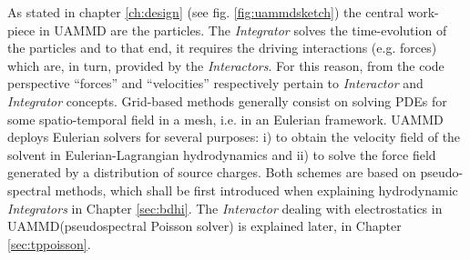 \documentclass[ twoside,openright,titlepage,numbers=noenddot,%
headinclude,footinclude,cleardoublepage=empty,abstract=on,
BCOR=5mm,paper=a4,fontsize=11pt, dvipsnames
]{scrreprt}
\newcommand{\uammd}{\gls{UAMMD}\xspace}
\begin{document}
As stated in chapter \ref{ch:design} (see fig. \ref{fig:uammdsketch}) the central work-piece in \uammd are the particles. The \emph{Integrator} solves the time-evolution of the particles and to that end, it requires the driving interactions (e.g. forces) which are, in turn, provided by the \emph{Interactors}. For this reason, from the code perspective ``forces'' and ``velocities'' respectively pertain to \emph{Interactor} and \emph{Integrator} concepts. Grid-based methods generally consist on solving \glspl{PDE} for some spatio-temporal field in a mesh, i.e. in an Eulerian framework. \uammd deploys Eulerian solvers for several purposes: i) to obtain the velocity field of the solvent in Eulerian-Lagrangian hydrodynamics and ii) to solve the force field generated by a distribution of source charges. Both schemes are based on pseudo-spectral methods, which shall be first introduced when explaining hydrodynamic \emph{Integrators} in Chapter \ref{sec:bdhi}. The \emph{Interactor} dealing with electrostatics in \uammd (pseudospectral Poisson solver) is explained later, in Chapter \ref{sec:tppoisson}.



\newpage



%
\end{document}
